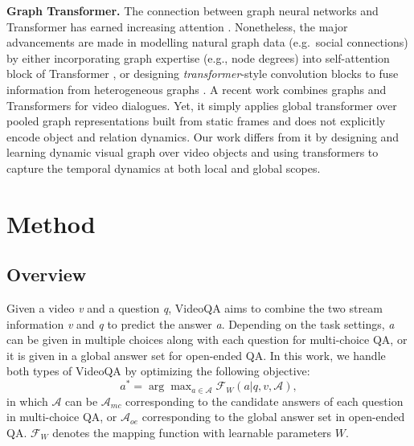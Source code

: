 \documentclass[runningheads]{llncs}
\newcommand{\eg}{e.g.}
\newcommand{\trans}{\emph{transformer}}
\begin{document}
\textbf{Graph Transformer.}
The connection between graph neural networks and Transformer has earned increasing attention \cite{wang2021tcl,ying2021transformers,yun2019graph}. Nonetheless, the major advancements are made in modelling natural graph data (\eg~social connections) by either incorporating graph expertise (\eg, node degrees) into self-attention block of Transformer \cite{ying2021transformers}, or designing \trans-style convolution blocks to fuse information from heterogeneous graphs \cite{yun2019graph}. A recent work \cite{geng2021dynamic} combines graphs and Transformers for video dialogues. Yet, it simply applies global transformer over pooled graph representations built from static frames and does not explicitly encode object and relation dynamics. Our work differs from it by designing and learning dynamic visual graph over video objects and using transformers to capture the temporal dynamics at both local and global scopes. 


\vspace{-0.2cm}
\section{Method}
\vspace{-0.2cm}
\subsection{Overview}
Given a video \textit{v} and a question \textit{q}, VideoQA aims to combine the two stream information \textit{v} and \textit{q} to predict the answer \textit{a}. Depending on the task settings, \textit{a} can be given in multiple choices along with each question for multi-choice QA, or it is given in a global answer set for open-ended QA. In this work, we handle both types of VideoQA by optimizing the following objective:
\begin{equation}\label{Obj}
    a^* = \arg\max\nolimits_{a \in \mathcal{A}} {\mathcal{F}_W(a | q, v, \mathcal{A})}, 
\end{equation}
in which $\mathcal{A}$ can be $\mathcal{A}_{mc}$ corresponding to the candidate answers of each question in multi-choice QA, or $\mathcal{A}_{oe}$ corresponding to the global answer set in open-ended QA. $\mathcal{F}_W$ denotes the mapping function with learnable parameters $W$.
\end{document}
